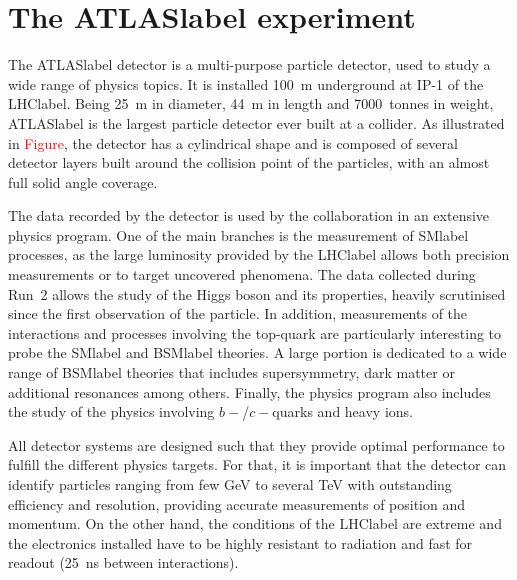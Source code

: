 

\section{The \acrshort{ATLASlabel} experiment}

The \acrshort{ATLASlabel} detector is a multi-purpose particle detector, used to study a wide range of physics topics. It is installed 100~m underground at IP-1 of the \acrshort{LHClabel}. Being 25~m in diameter, 44~m in length and 7000~tonnes in weight, \acrshort{ATLASlabel} is the largest particle detector ever built at a collider. As illustrated in \textcolor{red}{Figure}, the detector has a cylindrical shape and is composed of several detector layers built around the collision point of the particles, with an almost full solid angle coverage.

The data recorded by the detector is used by the collaboration in an extensive physics program. One of the main branches is the measurement of \acrshort{SMlabel} processes, as the large luminosity provided by the \acrshort{LHClabel} allows both precision measurements or to target uncovered phenomena. The data collected during Run~2 allows the study of the Higgs boson and its properties, heavily scrutinised since the first observation of the particle. In addition, measurements of the interactions and processes involving the top-quark are particularly interesting to probe the \acrshort{SMlabel} and \acrshort{BSMlabel} theories. A large portion is dedicated to a wide range of \acrshort{BSMlabel} theories that includes supersymmetry, dark matter or additional resonances among others. Finally, the physics program also includes the study of the physics involving $b-$/$c-$quarks and heavy ions.

All detector systems are designed such that they provide optimal performance to fulfill the different physics targets. For that, it is important that the detector can identify particles ranging from few GeV to several TeV with outstanding efficiency and resolution, providing accurate measurements of position and momentum. On the other hand, the conditions of the \acrshort{LHClabel} are extreme and the electronics installed have to be highly resistant to radiation and fast for readout (25~ns between interactions).


